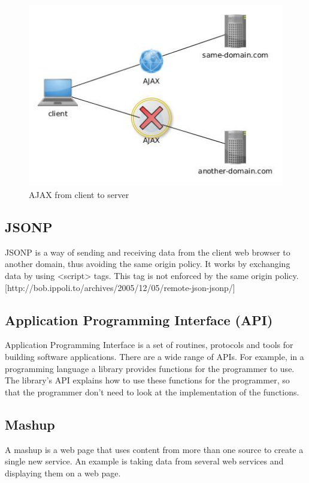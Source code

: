 \documentclass[10pt,a4paper]{article}
\begin{document}
\begin{figure}
\centering
\includegraphics[width=\linewidth]{../ajax/ajax}
\caption{AJAX from client to server}
\label{AJAX}
\end{figure}


\subsection{JSONP}
JSONP is a way of sending and receiving data from the client web browser to another domain, thus avoiding the same origin policy. It works by exchanging data by using <script> tags. This tag is not enforced by the same origin policy. [http://bob.ippoli.to/archives/2005/12/05/remote-json-jsonp/]


\subsection{Application Programming Interface (API)}
Application Programming Interface is a set of routines, protocols and tools for building software applications. There are a wide range of APIs. For example, in a programming language a library provides functions for the programmer to use. The library's API explains how to use these functions for the programmer, so that the programmer don't need to look at the implementation of the functions.
\subsection{Mashup}
A mashup is a web page that uses content from more than one source to create a single new service. An  example is taking data from several web services and displaying them on a web page.
\end{document}
